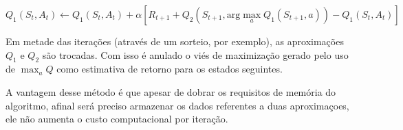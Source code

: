 \begin{equation}
\label{eq:doubleq}
Q_1(S_t, A_t) \leftarrow Q_1(S_t, A_t) + \alpha[R_{t+1} + Q_2(S_{t+1}, \text{arg}\max_a Q_1(S_{t+1}, a)) - Q_1(S_t, A_t)]
\end{equation}

Em metade das iterações (através de um sorteio, por exemplo), as aproximações $Q_1$ e $Q_2$ são trocadas. Com isso é anulado o viés de maximização gerado pelo uso de $\max_a Q$ como estimativa de retorno para os estados seguintes.

A vantagem desse método é que apesar de dobrar os requisitos de memória do algoritmo, afinal será preciso armazenar os dados referentes a duas aproximaçoes, ele não aumenta o custo computacional por iteração.
